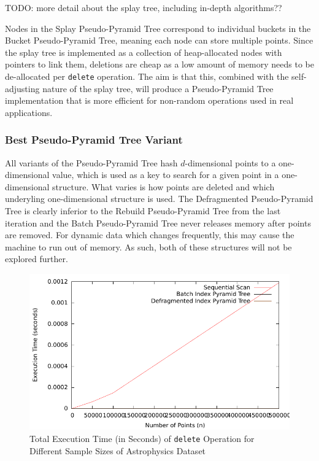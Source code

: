 TODO: more detail about the splay tree, including in-depth algorithms??

Nodes in the Splay Pseudo-Pyramid Tree correspond to individual buckets in the Bucket Pseudo-Pyramid Tree, meaning each node can store multiple points. Since the splay tree is implemented as a collection of heap-allocated nodes with pointers to link them, deletions are cheap as a low amount of memory needs to be de-allocated per \texttt{delete} operation. The aim is that this, combined with the self-adjusting nature of the splay tree, will produce a Pseudo-Pyramid Tree implementation that is more efficient for non-random operations used in real applications.

\subsubsection {Best Pseudo-Pyramid Tree Variant}

All variants of the Pseudo-Pyramid Tree hash $d$-dimensional points to a one-dimensional value, which is used as a key to search for a given point in a one-dimensional structure. What varies is how points are deleted and which underyling one-dimensional structure is used. The Defragmented Pseudo-Pyramid Tree is clearly inferior to the Rebuild Pseudo-Pyramid Tree from the last iteration and the Batch Pseudo-Pyramid Tree never releases memory after points are removed. For dynamic data which changes frequently, this may cause the machine to run out of memory. As such, both of these structures will not be explored further.

\begin{figure}
	\vspace{-40pt}
	\begin{center}
		\includegraphics[scale=0.5]{figures/performance_analysis/iteration_1/all_pquery_sizevary_average.pdf}
	\end{center}
	\vspace{-20pt}
	\caption{Total Execution Time (in Seconds) of \texttt{delete} Operation for Different Sample Sizes of Astrophysics Dataset}
	\label{fig:perf2-astrophysics-delete}
\end{figure}

